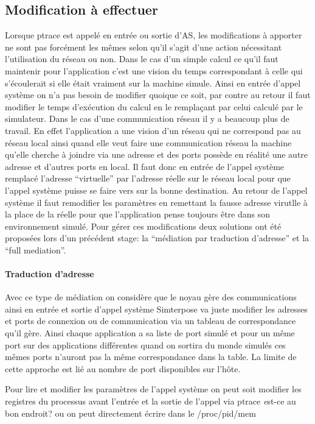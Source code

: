\subsection{Modification à effectuer}
Lorsque ptrace est appelé en entrée ou sortie d'AS, les modifications
à apporter ne sont pas forcément les mêmes selon qu'il s'agit d'une
action nécessitant l'utilisation du réseau ou non. Dans le cas d'un
simple calcul ce qu'il faut maintenir pour l'application c'est une
vision du temps correspondant à celle qui s'écoulerait si elle était
vraiment sur la machine simule. Ainsi en entrée d'appel système on n'a
pas besoin de modifier quoique ce soit, par contre au retour il faut
modifier le temps d'exécution du calcul en le remplaçant par celui
calculé par le simulateur. Dans le cas d'une communication réseau il y
a beaucoup plus de travail. En effet l'application a une vision d'un
réseau qui ne correspond pas au réseau local ainsi quand elle veut
faire une communication réseau la machine qu'elle cherche à joindre
via une adresse et des ports possède en réalité une autre adresse et
d'autres ports en local. Il faut donc en entrée de l'appel système
remplacé l'adresse ``virtuelle'' par l'adresse réelle sur le réseau
local pour que l'appel système puisse se faire vers sur la bonne
destination. Au retour de l'appel système il faut remodifier les
paramètres en remettant la fausse adresse virutlle à la place de la
réelle pour que l'application pense toujours être dans son
environnement simulé. Pour gérer ces modifications deux solutions ont
été proposées lors d'un précédent stage: la ``médiation par traduction
d'adresse'' et la ``full mediation''.
\paragraph{Traduction d'adresse} Avec ce type de médiation on considère que le noyau gère des communications ainsi en entrée et sortie d'appel système Simterpose va juste modifier les adresses et ports de connexion ou de communication via un tableau de correspondance qu'il gère. Ainsi chaque application a sa liste de port simulé et pour un même port sur des applications différentes quand on sortira du monde simulés ces mêmes ports n'auront pas la même correspondance dans la table. La limite de cette approche est lié au nombre de port disponibles sur l'hôte.

{\color{green} Pour lire et modifier les paramètres de l'appel système on peut
  soit modifier les registres du processus avant l'entrée et la sortie de
  l'appel via ptrace \textit est-ce au bon endroit?} {\color{red}ou on peut
  directement écrire dans le /proc/pid/mem}

